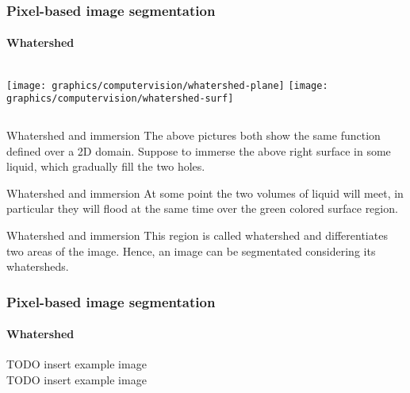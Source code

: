     \begin{frame}
        \frametitle{Pixel-based image segmentation}
        \framesubtitle{Whatershed}
        \begin{columns}[onlytextwidth]
            \texttt{[image: graphics/computervision/whatershed-plane]}
            \texttt{[image: graphics/computervision/whatershed-surf]}
        \end{columns}
         {
            \begin{block}{Whatershed and immersion}
                The above pictures both show the same function defined over a 2D domain. Suppose to immerse the above right surface in some liquid, which gradually fill the two holes.
            \end{block}
        }
         {
            \begin{block}{Whatershed and immersion}
                At some point the two volumes of liquid will meet, in particular they will flood at the same time over the green colored surface region.
            \end{block}
        }
         {
            \begin{block}{Whatershed and immersion}
                This region is called whatershed and differentiates two areas of the image. Hence, an image can be segmentated considering its whatersheds.
            \end{block}
        }
    \end{frame}

    \begin{frame}
        \frametitle{Pixel-based image segmentation}
        \framesubtitle{Whatershed}
        TODO insert example image\\
        TODO insert example image
    \end{frame}


